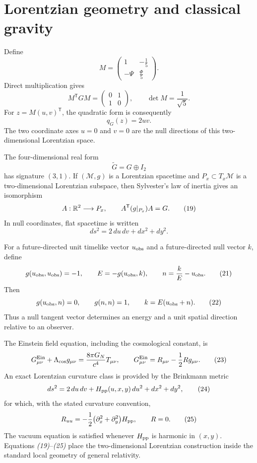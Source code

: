 \section{Lorentzian geometry and classical gravity}

Define
\[
M=
\begin{pmatrix}
1&-\frac15\\[2pt]
-\Psi&\frac{\Phi}{5}
\end{pmatrix}.
\tag{15}
\]
Direct multiplication gives
\[
M^{\mathsf T}GM=
\begin{pmatrix}0&1\\1&0\end{pmatrix},
\qquad
\det M=\frac{1}{\sqrt5}.
\tag{16}
\]
For $z=M(u,v)^{\mathsf T}$, the quadratic form is consequently
\[
q_G(z)=2uv.
\tag{17}
\]
The two coordinate axes $u=0$ and $v=0$ are the null directions of this
two-dimensional Lorentzian space.

The four-dimensional real form
\[
\widetilde G=G\oplus I_2
\tag{18}
\]
has signature $(3,1)$.  If $(\mathcal M,g)$ is a Lorentzian spacetime and
$P_x\subset T_x\mathcal M$ is a two-dimensional Lorentzian subspace, then
Sylvester's law of inertia gives an isomorphism
\[
A:\mathbb R^2\longrightarrow P_x,\qquad
A^{\mathsf T}(g|_{P_x})A=G.
\tag{19}
\]
In null coordinates, flat spacetime is written
\[
ds^2=2\,du\,dv+dx^2+dy^2.
\tag{20}
\]

For a future-directed unit timelike vector $u_{\rm obs}$ and a
future-directed null vector $k$, define
\[
g(u_{\rm obs},u_{\rm obs})=-1,\qquad
E=-g(u_{\rm obs},k),\qquad
n=\frac{k}{E}-u_{\rm obs}.
\tag{21}
\]
Then
\[
g(u_{\rm obs},n)=0,\qquad
g(n,n)=1,\qquad
k=E(u_{\rm obs}+n).
\tag{22}
\]
Thus a null tangent vector determines an energy and a unit spatial direction
relative to an observer.

The Einstein field equation, including the cosmological constant, is
\[
G^{\rm Ein}_{\mu\nu}+\Lambda_{\rm cos}g_{\mu\nu}
=\frac{8\pi G_N}{c^4}T_{\mu\nu},
\qquad
G^{\rm Ein}_{\mu\nu}
=R_{\mu\nu}-\frac12Rg_{\mu\nu}.
\tag{23}
\]
An exact Lorentzian curvature class is provided by the Brinkmann metric
\[
ds^2=2\,du\,dv+H_{\rm pp}(u,x,y)\,du^2+dx^2+dy^2,
\tag{24}
\]
for which, with the stated curvature convention,
\[
R_{uu}=-\frac12
\bigl(\partial_x^2+\partial_y^2\bigr)H_{\rm pp},
\qquad R=0.
\tag{25}
\]
The vacuum equation is satisfied whenever $H_{\rm pp}$ is harmonic in
$(x,y)$.  Equations \emph{(19)}--\emph{(25)} place the two-dimensional
Lorentzian construction inside the standard local geometry of general
relativity.


